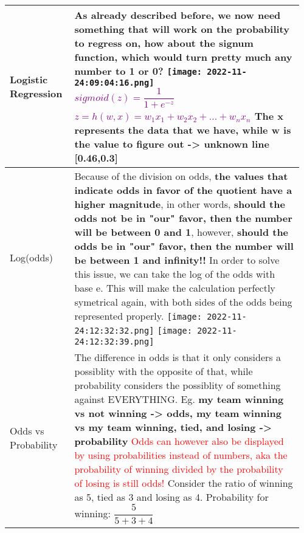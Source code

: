 \documentclass[main.tex,fontsize=8pt,paper=a4,paper=portrait,DIV=calc,]{scrartcl}
\begin{document}
\pagebreak
\begin{table}[ht!]
\begin{tabular}{|m{0.2\linewidth}|m{0.755\linewidth}|}
\hline
Logistic Regression & 
As already described before, we now need something that will work on the probability to regress on, how about the signum function, which would turn pretty much any number to 1 or 0?\newline
\minipg{
\texttt{[image: 2022-11-24:09:04:16.png]}\newline
}{
  \large \textcolor{purple}{\( sigmoid(z) = \dfrac{1}{1 + e^{-z}}\)}\newline
  \large \textcolor{purple}{\( z = h(w,x) = w_1x_1 + w_2x_2 + \text{...} + w_nx_n \)}\newline
  \normalsize \textbf{The x represents the data that we have, while w is the value to figure out -> unknown line}
}[0.46,0.3]
\\
\hline
Log(odds) & 
Because of the division on odds, \textbf{the values that indicate odds in favor of the quotient have a higher magnitude}, in other words, \textbf{should the odds not be in "our" favor, then the number will be between 0 and 1}, however, \textbf{should the odds be in "our" favor, then the number will be between 1 and infinity!!}\newline
In order to solve this issue, we can take the log of the odds with base e.\newline
This will make the calculation perfectly symetrical again, with both sides of the odds being represented properly.\newline
\texttt{[image: 2022-11-24:12:32:32.png]} \texttt{[image: 2022-11-24:12:32:39.png]}
\\
\hline
Odds vs Probability & 
The difference in odds is that it only considers a possiblity with the opposite of that, while probability considers the possiblity of something against EVERYTHING.\newline
Eg. \textbf{my team winning vs not winning -> odds, my team winning vs my team winning, tied, and losing -> probability}\newline
\textcolor{red}{Odds can however also be displayed by using probabilities instead of numbers, aka the probability of winning divided by the probability of losing is still odds!}\newline
Consider the ratio of winning as 5, tied as 3 and losing as 4.\newline
Probability for winning: \( \dfrac{5}{5+3+4} \) \newline

\end{tabular}
\end{table}
\end{document}
